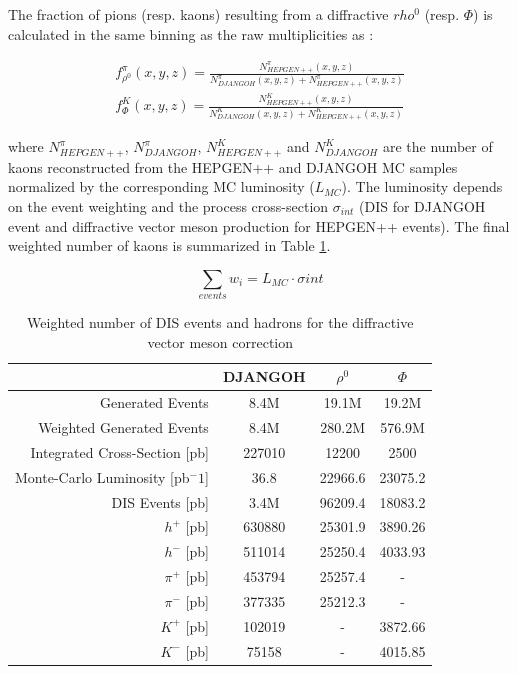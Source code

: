 \documentclass[letterpaper,12pt]{article}
\begin{document}
The fraction of pions (resp. kaons) resulting from a diffractive $rho^0$ (resp. $\Phi$) is calculated in the same binning as the raw multiplicities as :

\begin{equation}
  \begin{split}
    f^{\pi}_{\rho^0}(x,y,z) = \frac{N^{\pi}_{HEPGEN++}(x,y,z)}{N^{\pi}_{DJANGOH}(x,y,z)+N^{\pi}_{HEPGEN++}(x,y,z)} \\
    f^K_{\Phi}(x,y,z) = \frac{N^K_{HEPGEN++}(x,y,z)}{N^K_{DJANGOH}(x,y,z)+N^K_{HEPGEN++}(x,y,z)}
  \end{split}
\end{equation}

where $N^{\pi}_{HEPGEN++}$, $N^{\pi}_{DJANGOH}$, $N^K_{HEPGEN++}$ and $N^K_{DJANGOH}$ are the number of kaons reconstructed from the HEPGEN++ and DJANGOH MC samples normalized by the corresponding
MC luminosity ($L_{MC}$). The luminosity depends on the event weighting and the process cross-section $\sigma_{int}$ (DIS for DJANGOH event and diffractive
vector meson production for HEPGEN++ events). The final weighted number of kaons is summarized in Table \ref{DVM}.

\begin{equation}
  \sum_{events} w_i = L_{MC} \cdot \sigma{int}
\end{equation}

\begin{table}
	\centering
	\begin{tabular}{rccc}
    \hline
     & DJANGOH & $\rho^0$ & $\Phi$ \\
    \hline
    Generated Events & 8.4M & 19.1M & 19.2M  \\
    Weighted Generated Events & 8.4M & 280.2M & 576.9M  \\
		Integrated Cross-Section [pb] & 227010 & 12200 & 2500  \\
		Monte-Carlo Luminosity [pb$^-1$] & 36.8 & 22966.6 & 23075.2  \\
    \hline
		DIS Events [pb] & 3.4M & 96209.4 & 18083.2  \\
		$h^+$ [pb] & 630880 & 25301.9 & 3890.26  \\
		$h^-$ [pb] & 511014 & 25250.4 & 4033.93  \\
		$\pi^+$ [pb] & 453794 & 25257.4 & -  \\
		$\pi^-$ [pb] & 377335 & 25212.3 & -  \\
		$K^+$ [pb] & 102019 & - & 3872.66  \\
		$K^-$ [pb] & 75158 & - & 4015.85 \\
  \end{tabular}
  \caption{Weighted number of DIS events and hadrons for the diffractive vector meson correction}
  \label{DVM}
\end{table}
\end{document}
